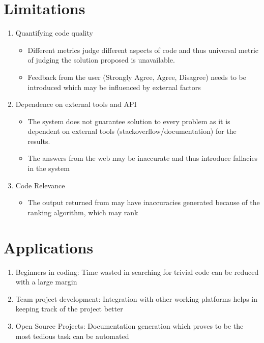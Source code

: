 \documentclass[oneside,a4paper,12pt, times]{book}
\begin{document}
\section{Limitations}
\begin{enumerate}
   
    \item Quantifying code quality
    \begin{itemize}
        \item Different metrics judge different aspects of code and thus universal metric of judging the solution proposed is unavailable.
        \item Feedback from the user (Strongly Agree, Agree, Disagree) needs to be introduced which may be influenced by external factors
    \end{itemize}
    \item Dependence on external tools and API
    \begin{itemize}
        \item The system does not guarantee solution to every problem as it is dependent on external tools (stackoverflow/documentation) for the results.
        \item The answers from the web may be inaccurate and thus introduce fallacies in the system
    \end{itemize}
     \item Code Relevance
    \begin{itemize}
        \item The output returned from may have inaccuracies generated because of the ranking algorithm, which may rank 
    \end{itemize}
\end{enumerate}


\section{Applications}
\begin{enumerate}
    \item Beginners in coding: Time wasted in searching for trivial code can be reduced with a large margin
    \item Team project development: Integration with other working platforms helps in keeping track of the project better
    \item Open Source Projects: Documentation generation which proves to be the most tedious task can be automated 
\end{enumerate}
\end{document}
